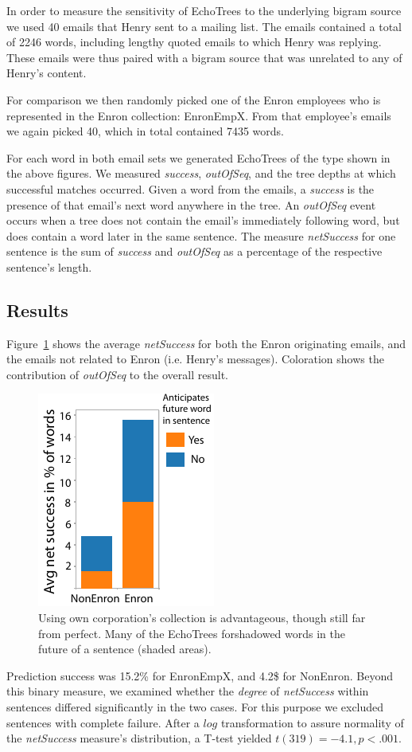 \documentclass{sigchi}
\begin{document}
In order to measure the sensitivity of EchoTrees to the underlying
bigram source we used 40 emails that Henry sent to a mailing list. The
emails contained a total of 2246 words, including lengthy quoted
emails to which Henry was replying. These emails were thus paired with
a bigram source that was unrelated to any of Henry's content.

For comparison we then randomly picked one of the Enron employees
who is represented in the Enron collection: EnronEmpX. From that
employee's emails we again picked 40, which in total contained 7435
words. 

For each word in both email sets we generated EchoTrees of the type
shown in the above figures. We measured {\em success}, {\em outOfSeq},
and the tree depths at which successful matches occurred. Given a word
from the emails, a {\em success} is the presence of that email's next
word anywhere in the tree. An {\em outOfSeq} event occurs when a tree
does not contain the email's immediately following word, but does
contain a word later in the same sentence. The measure {\em
  netSuccess} for one sentence is the sum of {\em success} and {\em
  outOfSeq} as a percentage of the respective sentence's length.
\subsection{Results}
Figure~\ref{fig:netSuccess} shows the average {\em netSuccess} for
both the Enron originating emails, and the emails not related to Enron
(i.e. Henry's messages). Coloration shows the contribution of {\em
  outOfSeq} to the overall result.
\begin{figure}
   \centering
   \includegraphics{Figs/relativeNetSuccessBarGraphCleanedSmall.pdf}
   \caption{Using own corporation's collection is advantageous, though
     still far from perfect. Many of the EchoTrees forshadowed words
     in the future of a sentence (shaded areas).}
   \label{fig:netSuccess}
\end{figure}
Prediction success was 15.2\% for EnronEmpX, and 4.2\$ for
NonEnron. Beyond this binary measure, we examined whether the {\em
  degree} of {\em netSuccess} within sentences differed significantly
in the two cases. For this purpose we excluded sentences with complete
failure. After a $log$ transformation to assure normality of the {\em
  netSuccess} measure's distribution, a T-test yielded $t(319)=-4.1,
p<.001$.
\end{document}
